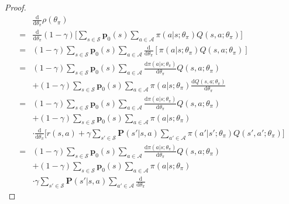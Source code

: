 \begin{proof}
    \begin{align*}
        &\frac{\mathrm{d}}{\mathrm{d} \theta_\pi}\rho(\theta_\pi)\\
        =& \frac{\mathrm{d}}{\mathrm{d} \theta_\pi}(1 - \gamma) \bigg[
            \sum_{s \in \mathcal{S}} 
            \mathbf{p}_0(s) \sum_{a \in \mathcal{A}} 
            \pi(a \vert s; \theta_\pi) 
            Q(s, a; \theta_\pi)\bigg]\\
        =& (1 - \gamma) \sum_{s \in \mathcal{S}} 
            \mathbf{p}_0(s) \sum_{a \in \mathcal{A}} 
            \frac{\mathrm{d}}{\mathrm{d} \theta_\pi}
            [\pi(a \vert s; \theta_\pi) 
            Q(s, a; \theta_\pi)]\\
        =& (1 - \gamma) \sum_{s \in \mathcal{S}} 
            \mathbf{p}_0(s) \sum_{a \in \mathcal{A}} 
            \frac{\mathrm{d}\pi(a \vert s; \theta_\pi)}{\mathrm{d} \theta_\pi}
            Q(s, a; \theta_\pi)\\
        & + (1 - \gamma) \sum_{s \in \mathcal{S}} 
            \mathbf{p}_0(s) \sum_{a \in \mathcal{A}} 
            \pi(a \vert s; \theta_\pi)
            \frac{\mathrm{d}Q(s, a; \theta_\pi)}{\mathrm{d} \theta_\pi}\\
        =& (1 - \gamma) \sum_{s \in \mathcal{S}} 
            \mathbf{p}_0(s) \sum_{a \in \mathcal{A}} 
            \frac{\mathrm{d}\pi(a \vert s; \theta_\pi)}{\mathrm{d} \theta_\pi}
            Q(s, a; \theta_\pi)\\
        & + (1 - \gamma) \sum_{s \in \mathcal{S}} 
            \mathbf{p}_0(s) \sum_{a \in \mathcal{A}} 
            \pi(a \vert s; \theta_\pi)\\
        & \cdot \frac{\mathrm{d}}{\mathrm{d} \theta_\pi}
            \bigg[ r(s, a) + \gamma \sum_{s' \in \mathcal{S}} 
            \mathbf{P}(s' \vert s, a) \sum_{a' \in \mathcal{A}} 
            \pi(a' \vert s'; \theta_\pi) Q(s', a'; \theta_\pi)\bigg]\\
        =& (1 - \gamma) \sum_{s \in \mathcal{S}} 
            \mathbf{p}_0(s) \sum_{a \in \mathcal{A}} 
            \frac{\mathrm{d}\pi(a \vert s; \theta_\pi)}{\mathrm{d} \theta_\pi}
            Q(s, a; \theta_\pi)\\
        & + (1 - \gamma) \sum_{s \in \mathcal{S}} 
            \mathbf{p}_0(s) \sum_{a \in \mathcal{A}} \pi(a \vert s; \theta_\pi)\\
        & \cdot \gamma \sum_{s' \in \mathcal{S}}
            \mathbf{P}(s' \vert s, a) \sum_{a' \in \mathcal{A}} 
        \frac{\mathrm{d}}{\mathrm{d} \theta_\pi}

\end{align*}
\end{proof}
